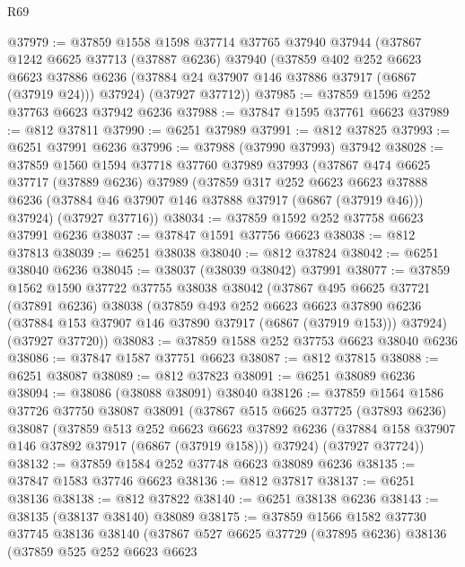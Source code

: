 \begin{lexlean}{R69}
\begin{coremodule}
{@37979 := @37859
    @1558
    @1598
    @37714
    @37765
    @37940
    @37944
    (@37867
      @1242
      @6625
      @37713
      (@37887 @6236)
      @37940
      (@37859
        @402
        @252
        @6623
        @6623
        @37886
        @6236
        (@37884 @24 @37907 @146 @37886 @37917 (@6867 (@37919 @24)))
        @37924)
      (@37927 @37712))
@37985 := @37859 @1596 @252 @37763 @6623 @37942 @6236
@37988 := @37847 @1595 @37761 @6623
@37989 := @812 @37811
@37990 := @6251 @37989
@37991 := @812 @37825
@37993 := @6251 @37991 @6236
@37996 := @37988 (@37990 @37993) @37942
@38028 := @37859
    @1560
    @1594
    @37718
    @37760
    @37989
    @37993
    (@37867
      @474
      @6625
      @37717
      (@37889 @6236)
      @37989
      (@37859
        @317
        @252
        @6623
        @6623
        @37888
        @6236
        (@37884 @46 @37907 @146 @37888 @37917 (@6867 (@37919 @46)))
        @37924)
      (@37927 @37716))
@38034 := @37859 @1592 @252 @37758 @6623 @37991 @6236
@38037 := @37847 @1591 @37756 @6623
@38038 := @812 @37813
@38039 := @6251 @38038
@38040 := @812 @37824
@38042 := @6251 @38040 @6236
@38045 := @38037 (@38039 @38042) @37991
@38077 := @37859
    @1562
    @1590
    @37722
    @37755
    @38038
    @38042
    (@37867
      @495
      @6625
      @37721
      (@37891 @6236)
      @38038
      (@37859
        @493
        @252
        @6623
        @6623
        @37890
        @6236
        (@37884 @153 @37907 @146 @37890 @37917 (@6867 (@37919 @153)))
        @37924)
      (@37927 @37720))
@38083 := @37859 @1588 @252 @37753 @6623 @38040 @6236
@38086 := @37847 @1587 @37751 @6623
@38087 := @812 @37815
@38088 := @6251 @38087
@38089 := @812 @37823
@38091 := @6251 @38089 @6236
@38094 := @38086 (@38088 @38091) @38040
@38126 := @37859
    @1564
    @1586
    @37726
    @37750
    @38087
    @38091
    (@37867
      @515
      @6625
      @37725
      (@37893 @6236)
      @38087
      (@37859
        @513
        @252
        @6623
        @6623
        @37892
        @6236
        (@37884 @158 @37907 @146 @37892 @37917 (@6867 (@37919 @158)))
        @37924)
      (@37927 @37724))
@38132 := @37859 @1584 @252 @37748 @6623 @38089 @6236
@38135 := @37847 @1583 @37746 @6623
@38136 := @812 @37817
@38137 := @6251 @38136
@38138 := @812 @37822
@38140 := @6251 @38138 @6236
@38143 := @38135 (@38137 @38140) @38089
@38175 := @37859
    @1566
    @1582
    @37730
    @37745
    @38136
    @38140
    (@37867
      @527
      @6625
      @37729
      (@37895 @6236)
      @38136
      (@37859
        @525
        @252
        @6623
        @6623
}
\end{coremodule}
\end{lexlean}
